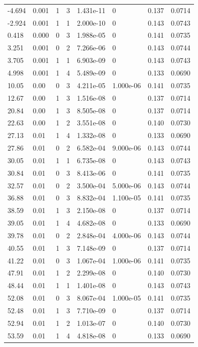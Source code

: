 \documentclass[preview]{standalone}
\begin{document}
{{\begin{tabular}{L{1.2cm}C{1.2cm} C{0.3cm}C{0.5cm} C{1.4cm}C{1.4cm} C{1.4cm}C{1.4cm}}
  -4.694  &  0.001  & 1     &  3 &  1.431e-11  & 0  & 0.137 &  0.0714   \\ 
  -2.924  &  0.001  & 1     &  1 &  2.000e-10  & 0  & 0.143 &  0.0743   \\ 
  0.418  &  0.000  & 0     &  3 &  1.988e-05  & 0  & 0.141 &  0.0735   \\ 
  3.251  &  0.001  & 0     &  2 &  7.266e-06  & 0  & 0.143 &  0.0744   \\ 
  3.705  &  0.001  & 1     &  1 &  6.903e-09  & 0  & 0.143 &  0.0743   \\ 
  4.998  &  0.001  & 1     &  4 &  5.489e-09  & 0  & 0.133 &  0.0690   \\ 
  10.05  &  0.00  & 0     &  3 &  4.211e-05  & 1.000e-06  & 0.141 &  0.0735   \\ 
  12.67  &  0.00  & 1     &  3 &  1.516e-08  & 0  & 0.137 &  0.0714   \\ 
  20.84  &  0.00  & 1     &  3 &  8.505e-08  & 0  & 0.137 &  0.0714   \\ 
  22.63  &  0.00  & 1     &  2 &  3.551e-08  & 0  & 0.140 &  0.0730   \\ 
  27.13  &  0.01  & 1     &  4 &  1.332e-08  & 0  & 0.133 &  0.0690   \\ 
  27.86  &  0.01  & 0     &  2 &  6.582e-04  & 9.000e-06  & 0.143 &  0.0744   \\ 
  30.05  &  0.01  & 1     &  1 &  6.735e-08  & 0  & 0.143 &  0.0743   \\ 
  30.84  &  0.01  & 0     &  3 &  8.413e-06  & 0  & 0.141 &  0.0735   \\ 
  32.57  &  0.01  & 0     &  2 &  3.500e-04  & 5.000e-06  & 0.143 &  0.0744   \\ 
  36.88  &  0.01  & 0     &  3 &  8.832e-04  & 1.100e-05  & 0.141 &  0.0735   \\ 
  38.59  &  0.01  & 1     &  3 &  2.150e-08  & 0  & 0.137 &  0.0714   \\ 
  39.05  &  0.01  & 1     &  4 &  4.682e-08  & 0  & 0.133 &  0.0690   \\ 
  39.78  &  0.01  & 0     &  2 &  2.848e-04  & 4.000e-06  & 0.143 &  0.0744   \\ 
  40.55  &  0.01  & 1     &  3 &  7.148e-09  & 0  & 0.137 &  0.0714   \\ 
  41.22  &  0.01  & 0     &  3 &  1.067e-04  & 1.000e-06  & 0.141 &  0.0735   \\ 
  47.91  &  0.01  & 1     &  2 &  2.299e-08  & 0  & 0.140 &  0.0730   \\ 
  48.44  &  0.01  & 1     &  1 &  1.401e-08  & 0  & 0.143 &  0.0743   \\ 
  52.08  &  0.01  & 0     &  3 &  8.067e-04  & 1.000e-05  & 0.141 &  0.0735   \\ 
  52.48  &  0.01  & 1     &  3 &  7.710e-09  & 0  & 0.137 &  0.0714   \\ 
  52.94  &  0.01  & 1     &  2 &  1.013e-07  & 0  & 0.140 &  0.0730   \\ 
  53.59  &  0.01  & 1     &  4 &  4.818e-08  & 0  & 0.133 &  0.0690   \\ 
\hline 
\end{tabular} 

}}
\end{document}

